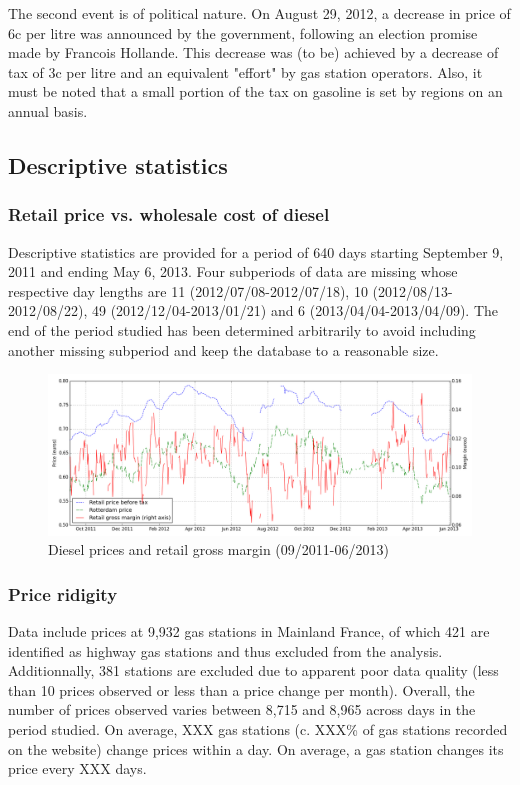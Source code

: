 \documentclass[11pt]{article}
\begin{document}
The second event is of political nature.
On August 29, 2012, a decrease in price of 6c per litre was announced by the government, following an election promise made by Francois Hollande. This decrease was (to be) achieved by a decrease of tax of 3c per litre and an equivalent "effort" by gas station operators. Also, it must be noted that a small portion of the tax on gasoline is set by regions on an annual basis.

\subsection{Descriptive statistics}

\subsubsection{Retail price vs. wholesale cost of diesel}

Descriptive statistics are provided for a period of 640 days starting September 9, 2011 and ending May 6, 2013. Four subperiods of data are missing whose respective day lengths are 11 (2012/07/08-2012/07/18), 10 (2012/08/13-2012/08/22), 49 (2012/12/04-2013/01/21) and 6 (2013/04/04-2013/04/09). The end of the period studied has been determined arbitrarily to avoid including another missing subperiod and keep the database to a reasonable size.

\begin{figure}[!h]
    \caption{Diesel prices and retail gross margin (09/2011-06/2013)}
	\centering
		\includegraphics[width=16cm]{graphs/diesel_price_margin.png}
\end{figure}

\subsubsection{Price ridigity}

Data include prices at 9,932 gas stations in Mainland France, of which 421 are identified as highway gas stations and thus excluded from the analysis. Additionnally, 381 stations are excluded due to apparent poor data quality (less than 10 prices observed or less than a price change per month). Overall, the number of prices observed varies between 8,715 and 8,965 across days in the period studied. On average, XXX gas stations (c. XXX\% of gas stations recorded on the website) change prices within a day. On average, a gas station changes its price every XXX days.
\end{document}
